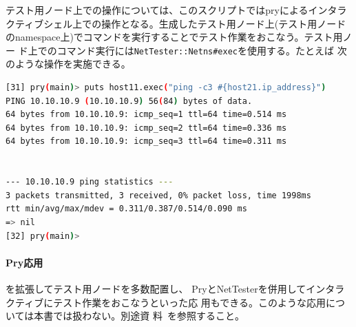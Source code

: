 テスト用ノード上での操作については、このスクリプトではpryによるインタラ
クティブシェル上での操作となる。生成したテスト用ノード上(テスト用ノード
のnamespace上)でコマンドを実行することでテスト作業をおこなう。テスト用ノー
ド上でのコマンド実行には\verb|NetTester::Netns#exec|を使用する。たとえば
次のような操作を実施できる。
\begin{lstlisting}[language=sh,title=テスト作業例]
[31] pry(main)> puts host11.exec("ping -c3 #{host21.ip_address}")
PING 10.10.10.9 (10.10.10.9) 56(84) bytes of data.
64 bytes from 10.10.10.9: icmp_seq=1 ttl=64 time=0.514 ms
64 bytes from 10.10.10.9: icmp_seq=2 ttl=64 time=0.336 ms
64 bytes from 10.10.10.9: icmp_seq=3 ttl=64 time=0.311 ms


--- 10.10.10.9 ping statistics ---
3 packets transmitted, 3 received, 0% packet loss, time 1998ms
rtt min/avg/max/mdev = 0.311/0.387/0.514/0.090 ms
=> nil
[32] pry(main)>
\end{lstlisting}

    \paragraph{Pry応用}
を拡張してテスト用ノードを多数配置し、
PryとNetTesterを併用してインタラクティブにテスト作業をおこなうといった応
用もできる。このような応用については本書では扱わない。別途資
料~\cite{nettester-pry}を参照すること。


